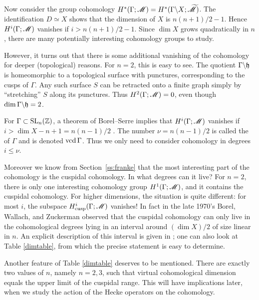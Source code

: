 \subsection{}\label{ss:vcd}
%
Now consider the group cohomology $H^{*} (\Gamma ; \mathscr M) = H^{*}
(\Gamma \backslash X; \widetilde{\mathscr M})$.  The identification $D\simeq
X$ shows that the dimension of $X$ is $n (n+1)/2 - 1$.  Hence $H^{i}
(\Gamma ; \mathscr M)$ vanishes if $i > n (n+1)/2 - 1$.  Since $\dim X$
grows quadratically in $n$, there are many potentially interesting
cohomology groups to study.

However, it turns out that there is some additional vanishing of the
cohomology for deeper (topological) reasons.  For $n=2$, this is easy
to see.  The quotient $\Gamma \backslash \mathfrak h$ is homeomorphic to a
topological surface with punctures, corresponding to the cusps of
$\Gamma$.  Any such surface $S$ can be retracted onto a finite graph
simply by ``stretching'' $S$ along its punctures.  Thus $H^{2} (\Gamma
; \mathscr M) = 0$, even though $\dim \Gamma \backslash \mathfrak h = 2$.

For $\Gamma \subset \operatorname{SL}_{n} (\mathbb{Z} )$, a theorem of Borel--Serre implies
that $H^{i} (\Gamma ;{\mathscr M})$ vanishes if $i> \dim X -n+1 = n(n-1)/2$
\cite[Theorem 11.4.4]{borel.serre}.  The number $\nu = n (n-1)/2$ is
called the  of $\Gamma $ and is
denoted $\operatorname{vcd} \Gamma$.  Thus we only need to consider cohomology in
degrees $i\leq \nu$.

Moreover we know from Section~\ref{ss:franke} that the most interesting part
of the cohomology is the cuspidal cohomology.  In what degrees can it
live?  For $n=2$, there is only one interesting cohomology group
$H^{1} (\Gamma ; \mathscr M)$, and it contains the cuspidal cohomology.  For
higher dimensions, the situation is quite different: for most $i$, the
subspace $H^{i}_{\text{cusp}} (\Gamma ; \mathscr M)$ vanishes!  In fact in
the late 1970's Borel, Wallach, and Zuckerman observed that the cuspidal
cohomology can only live in the cohomological degrees lying in an
interval around $(\dim X)/2$ of size linear in $n$.  An explicit
description of this interval is given in \cite[Proposition
3.5]{schwermer}; one can also look at Table \ref{dimtable}, from which
the precise statement is easy to determine.

Another feature of Table \ref{dimtable} deserves to be mentioned.
There are exactly two values of $n$, namely $n=2, 3$, such that
virtual cohomological dimension equals the upper limit of the cuspidal
range.  This will have implications later, when we study the action of
the Hecke operators on the cohomology.

